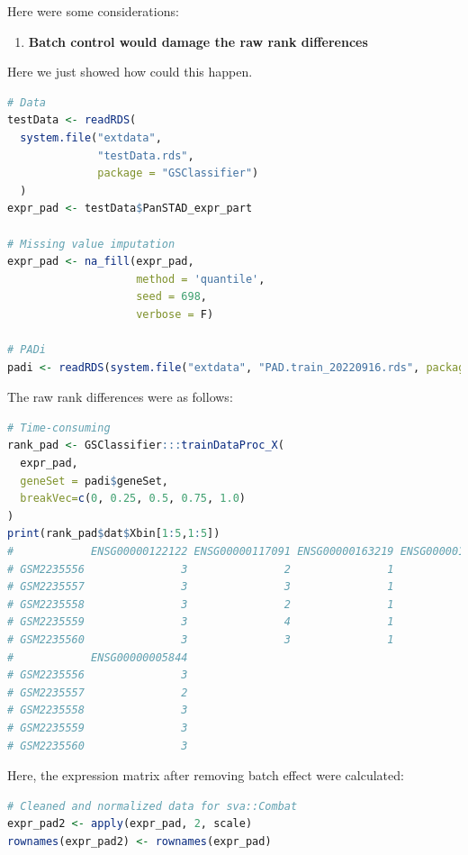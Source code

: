 \documentclass[
  12pt,
]{book}
\providecommand{\tightlist}{%
  \setlength{\itemsep}{0pt}\setlength{\parskip}{0pt}}
\begin{document}
Here were some considerations:

\begin{enumerate}
\def\labelenumi{\arabic{enumi}.}
\tightlist
\item
  \textbf{Batch control would damage the raw rank differences}
\end{enumerate}

Here we just showed how could this happen.

\begin{lstlisting}[language=R]
# Data
testData <- readRDS(
  system.file("extdata", 
              "testData.rds", 
              package = "GSClassifier")
  )
expr_pad <- testData$PanSTAD_expr_part

# Missing value imputation
expr_pad <- na_fill(expr_pad, 
                    method = 'quantile', 
                    seed = 698,
                    verbose = F)

# PADi
padi <- readRDS(system.file("extdata", "PAD.train_20220916.rds", package = "GSClassifier")) 
\end{lstlisting}

The raw rank differences were as follows:

\begin{lstlisting}[language=R]
# Time-consuming
rank_pad <- GSClassifier:::trainDataProc_X(
  expr_pad, 
  geneSet = padi$geneSet,
  breakVec=c(0, 0.25, 0.5, 0.75, 1.0)
)
print(rank_pad$dat$Xbin[1:5,1:5])
#            ENSG00000122122 ENSG00000117091 ENSG00000163219 ENSG00000136167
# GSM2235556               3               2               1               4
# GSM2235557               3               3               1               4
# GSM2235558               3               2               1               4
# GSM2235559               3               4               1               4
# GSM2235560               3               3               1               4
#            ENSG00000005844
# GSM2235556               3
# GSM2235557               2
# GSM2235558               3
# GSM2235559               3
# GSM2235560               3
\end{lstlisting}

Here, the expression matrix after removing batch effect were calculated:

\begin{lstlisting}[language=R]
# Cleaned and normalized data for sva::Combat
expr_pad2 <- apply(expr_pad, 2, scale)
rownames(expr_pad2) <- rownames(expr_pad)
\end{lstlisting}
\end{document}

